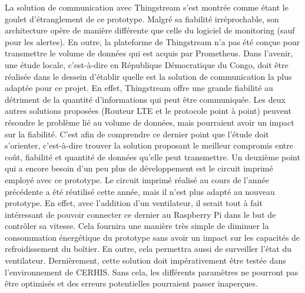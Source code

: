 \noindent
La solution de communication avec Thingstream s'est montrée comme étant le goulet d'étranglement de ce prototype. Malgré sa fiabilité irréprochable, son architecture opère de manière différente que celle du logiciel de monitoring (sauf pour les alertes). En outre, la plateforme de Thingstream n'a pas été conçue pour transmettre le volume de données qui est acquis par Prometheus. Dans l'avenir, une étude locale, c'est-à-dire en République Démocratique du Congo, doit être réalisée dans le dessein d'établir quelle est la solution de communication la plus adaptée pour ce projet. En effet, Thingstream offre une grande fiabilité au détriment de la quantité d'informations qui peut être communiquée. Les deux autres solutions proposées (Routeur LTE et le protocole point à point) peuvent résoudre le problème lié au volume de données, mais pourraient avoir un impact sur la fiabilité. C'est afin de comprendre ce dernier point que l'étude doit s'orienter, c'est-à-dire trouver la solution proposant le meilleur compromis entre coût, fiabilité et quantité de données qu'elle peut transmettre. Un deuxième point qui a encore besoin d'un peu plus de développement est le circuit imprimé employé avec ce prototype. Le circuit imprimé réalisé au cours de l'année précédente a été réutilisé cette année, mais il n'est plus adapté au nouveau prototype. En effet, avec l'addition d'un ventilateur, il serait tout à fait intéressant de pouvoir connecter ce dernier au Raspberry Pi dans le but de contrôler sa vitesse. Cela fournira une manière très simple de diminuer la consommation énergétique du prototype sans avoir un impact sur les capacités de refroidissement du boîtier. En outre, cela permettra aussi de surveiller l'état du ventilateur. Dernièrement, cette solution doit impérativement être testée dans l'environnement de CERHIS. Sans cela, les différents paramètres ne pourront pas être optimisés et des erreurs potentielles pourraient passer inaperçues.
